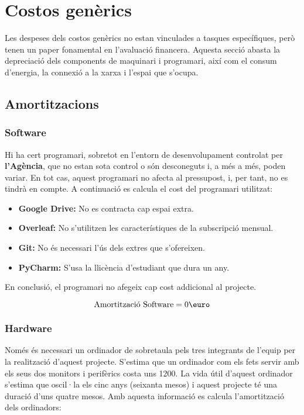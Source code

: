 \section{Costos genèrics}
Les despeses dels costos genèrics no estan vinculades a tasques específiques, però tenen un paper fonamental en l'avaluació financera. Aquesta secció abasta la depreciació dels components de maquinari i programari, així com el consum d'energia, la connexió a la xarxa i l'espai que s'ocupa. 

\subsection{Amortitzacions}
\subsubsection{Software}
Hi ha cert programari, sobretot en l'entorn de desenvolupament controlat per \textbf{l'Agència}, que no estan sota control o són desconeguts i, a més a més, poden variar. En tot cas, aquest programari no afecta al pressupost, i, per tant, no es tindrà en compte. A continuació es calcula el cost del programari utilitzat:

\begin{itemize}
    \item \textbf{Google Drive:} No es contracta cap espai extra.
    \item \textbf{Overleaf:} No s'utilitzen les característiques de la subscripció mensual.
    \item \textbf{Git:} No és necessari l'ús dels extres que s'ofereixen.
    \item \textbf{PyCharm:} S'usa la llicència d'estudiant que dura un any.
\end{itemize}

En conclusió, el programari no afegeix cap cost addicional al projecte.

$$
\text{Amortització Software} = 0\text{\euro}
$$

\subsubsection{Hardware}
Només és necessari un ordinador de sobretaula pels tres integrants de l'equip per la realització d'aquest projecte. S'estima que un ordinador com els fets servir amb els seus dos monitors i perifèrics costa uns 1200\text{\euro}. La vida útil d'aquest ordinador s'estima que oscil·la els cinc anys (seixanta mesos) i aquest projecte té una duració d'uns quatre mesos. Amb aquesta informació es calcula l'amortització dels ordinadors:

